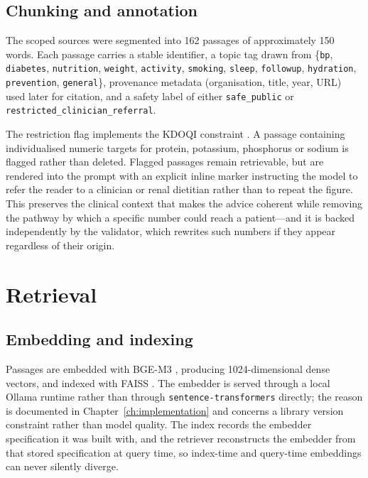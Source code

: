 \subsection{Chunking and annotation}

The scoped sources were segmented into 162 passages of approximately 150 words.
Each passage carries a stable identifier, a topic tag drawn from
\{\texttt{bp}, \texttt{diabetes}, \texttt{nutrition}, \texttt{weight},
\texttt{activity}, \texttt{smoking}, \texttt{sleep}, \texttt{followup},
\texttt{hydration}, \texttt{prevention}, \texttt{general}\}, provenance metadata
(organisation, title, year, URL) used later for citation, and a safety label of
either \texttt{safe\_public} or \texttt{restricted\_clinician\_referral}.

The restriction flag implements the KDOQI constraint \cite{kdoqi2020}. A passage
containing individualised numeric targets for protein, potassium, phosphorus or
sodium is flagged rather than deleted. Flagged passages remain retrievable, but
are rendered into the prompt with an explicit inline marker instructing the
model to refer the reader to a clinician or renal dietitian rather than to
repeat the figure. This preserves the clinical context that makes the advice
coherent while removing the pathway by which a specific number could reach a
patient---and it is backed independently by the validator, which rewrites such
numbers if they appear regardless of their origin.

\section{Retrieval}
\label{sec:retrieval_method}

\subsection{Embedding and indexing}

Passages are embedded with BGE-M3 \cite{chen2024bgem3}, producing 1024-dimensional
dense vectors, and indexed with FAISS \cite{johnson2019faiss}. The embedder is served through a local
Ollama runtime rather than through \texttt{sentence-transformers} directly; the
reason is documented in Chapter~\ref{ch:implementation} and concerns a library
version constraint rather than model quality. The index records the embedder
specification it was built with, and the retriever reconstructs the embedder
from that stored specification at query time, so index-time and query-time
embeddings can never silently diverge.

